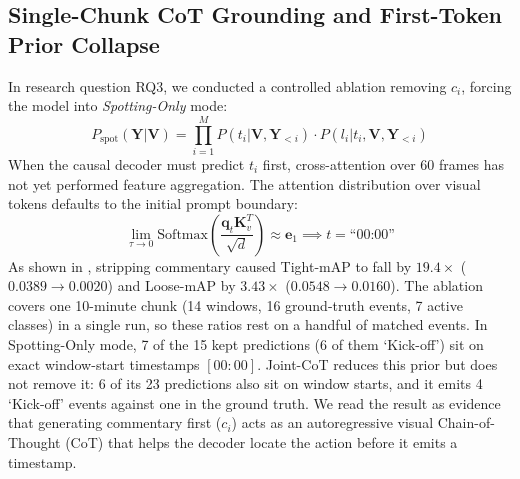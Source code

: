 \documentclass[10pt,twocolumn,letterpaper]{article}
\begin{document}
\subsection{Single-Chunk CoT Grounding and First-Token Prior Collapse}
In research question RQ3, we conducted a controlled ablation removing $c_i$, forcing the model into \textit{Spotting-Only} mode:
\begin{equation}
    P_{\text{spot}}(\mathbf{Y}|\mathbf{V}) = \prod_{i=1}^M P(t_i | \mathbf{V}, \mathbf{Y}_{<i}) \cdot P(l_i | t_i, \mathbf{V}, \mathbf{Y}_{<i})
\end{equation}
When the causal decoder must predict $t_i$ first, cross-attention over 60 frames has not yet performed feature aggregation. The attention distribution over visual tokens defaults to the initial prompt boundary:
\begin{equation}
    \lim_{\tau \to 0} \mathrm{Softmax}\left(\frac{\mathbf{q}_{t} \mathbf{K}_v^T}{\sqrt{d}}\right) \approx \mathbf{e}_1 \implies t = \text{``00:00''}
\end{equation}
As shown in , stripping commentary caused Tight-mAP to fall by \textbf{$19.4\times$} ($0.0389 \to 0.0020$) and Loose-mAP by $3.43\times$ ($0.0548 \to 0.0160$). The ablation covers one 10-minute chunk (14 windows, 16 ground-truth events, 7 active classes) in a single run, so these ratios rest on a handful of matched events. In Spotting-Only mode, 7 of the 15 kept predictions (6 of them `Kick-off') sit on exact window-start timestamps $[00:00]$. Joint-CoT reduces this prior but does not remove it: 6 of its 23 predictions also sit on window starts, and it emits 4 `Kick-off' events against one in the ground truth. We read the result as evidence that generating commentary first ($c_i$) acts as an autoregressive visual Chain-of-Thought (CoT) that helps the decoder locate the action before it emits a timestamp.

\begin{table}[h]
\centering
\small
\caption{\textbf{RQ3 Dual-Task Synergy: Joint-CoT vs. Spotting-Only (chunk 0, 10 minutes, 16 ground-truth events, single run; mAP over 17 classes).}}
\label{tab:rq3_ablation}
\end{table}
\end{document}
